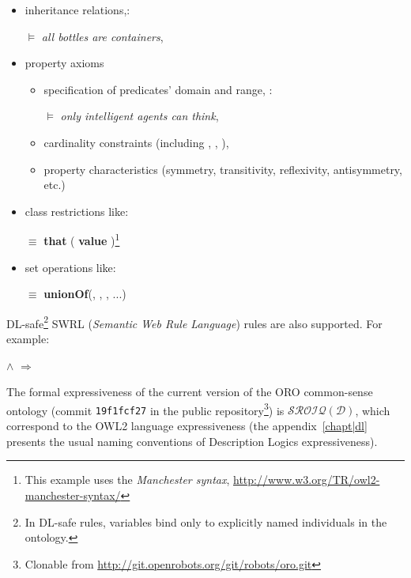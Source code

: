 \begin{itemize}
    \item inheritance relations,\eg: \par
     $\models$ \emph{all bottles are containers},

    \item property axioms
        \begin{itemize}

        \item specification of predicates' domain and range, \eg:\par
         $\models$ \emph{only
        intelligent agents can think},

        \item cardinality constraints (including , 
        , ),

        \item property characteristics (symmetry, transitivity, reflexivity,
        antisymmetry, etc.)

        \end{itemize}

    \item class restrictions like: \par {} $\equiv$
         {\bf that} ( {\bf value}
        )\footnote{This example uses the \emph{Manchester
        syntax}, \url{http://www.w3.org/TR/owl2-manchester-syntax/}}

    \item set operations like: \par {} $\equiv$ {\bf unionOf}(,
        , , ...)
\end{itemize}

DL-safe\footnote{In DL-safe rules, variables bind only to explicitly named
individuals in the ontology.} SWRL ({\em Semantic Web Rule Language}) rules are
also supported. For example: \par
         $\land$
         $\Rightarrow$ 


The formal expressiveness of the current version of the ORO common-sense
ontology (commit {\tt 19f1fcf27} in the public repository\footnote{Clonable
from \url{http://git.openrobots.org/git/robots/oro.git}}) is
$\mathcal{SROIQ(D)}$, which correspond to the OWL2 language expressiveness (the
appendix~\ref{chapt|dl} presents the usual naming conventions of Description
Logics expressiveness).

